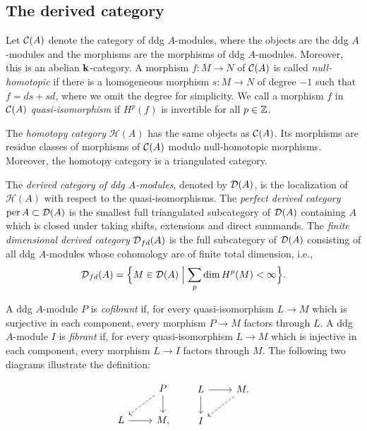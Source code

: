 \subsection{The derived category}
Let $\operatorname{\mathcal{C}}(A)$ denote the category of ddg $A$-modules,
where the objects are the ddg $A$-modules
and the morphisms are the morphisms of ddg $A$-modules.
Moreover, this is an abelian $\mathbf{k}$-category.
A morphism $f \colon M \to N$ of $\operatorname{\mathcal{C}}(A)$ is called \textit{null-homotopic}
if there is a homogeneous morphism $s \colon M \to N$ of degree $-1$
such that $f = ds+sd$, where we omit the degree for simplicity.
We call a morphism $f$ in $\operatorname{\mathcal{C}}(A)$ \textit{quasi-isomorphism}
if $H^p(f)$ is invertible for all $p \in \mathbb{Z}$.

The \textit{homotopy category} $\mathcal{H}(A)$ has the same objects as $\operatorname{\mathcal{C}}(A)$.
Its morphisms are residue classes of morphisms of $\operatorname{\mathcal{C}}(A)$
modulo null-homotopic morphisms.
Moreover, the homotopy category is a triangulated category.

The \textit{derived category of ddg $A$-modules},
denoted by $\operatorname{\mathcal{D}}(A)$, is the localization of $\mathcal{H}(A)$
with respect to the quasi-isomorphisms.
The \textit{perfect derived category} $\operatorname{per} A \subset \operatorname{\mathcal{D}}(A)$
is the smallest full triangulated subcategory of $\operatorname{\mathcal{D}}(A)$ containing $A$
which is closed under taking shifts, extensions and direct summands.
The \textit{finite dimensional derived category} $\operatorname{\mathcal{D}}_{fd}(A)$
is the full subcategory of $\operatorname{\mathcal{D}}(A)$ consisting of all ddg $A$-modules
whose cohomology are of finite total dimension, i.e.,
\[ \operatorname{\mathcal{D}}_{fd}(A) = \Bigl\{ M \in \operatorname{\mathcal{D}}(A) \Bigm| \sum_p \dim H^p(M) < \infty \Bigr\}. \]

A ddg $A$-module $P$ is \textit{cofibrant} if,
for every quasi-isomorphism $L \to M$ which is surjective in each component,
every morphism $P \to M$ factors through $L$.
A ddg $A$-module $I$ is \textit{fibrant} if,
for every quasi-isomorphism $L \to M$ which is injective in each component,
every morphism $L \to I$ factors through $M$.
The following two diagrams illustrate the definition:

\[
  \begin{tikzcd}
    & P \ar[dl, dashed] \ar[d] \\ L \ar[r] & M,
  \end{tikzcd}
  \quad \quad
  \begin{tikzcd}
    L \ar[r] \ar[d] & M. \ar[dl, dashed] \\ I
  \end{tikzcd}
\]


